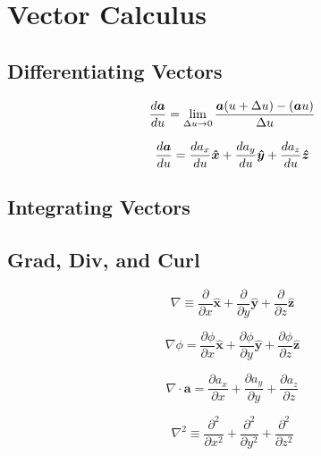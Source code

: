 \chapter{Vector Calculus}

\section{Differentiating Vectors}

\begin{equation*}
    \frac{d\boldsymbol{a}}{du} = \lim_{\Delta u \to 0}
    \frac{\boldsymbol{a}(u + \Delta u)-(\boldsymbol{a}u)}{\Delta u}
\end{equation*}

\begin{equation*}
    \frac{d\boldsymbol{a}}{du} = \frac{da_x}{du}\boldsymbol{\hat{x}} +
    \frac{da_y}{du}\boldsymbol{\hat{y}} +
    \frac{da_z}{du}\boldsymbol{\hat{z}}
\end{equation*}
\section{Integrating Vectors}

\section{Grad, Div, and Curl}

\begin{equation*}
    \nabla \equiv \frac{\partial}{\partial x}\boldsymbol{\hat{x}} +
    \frac{\partial}{\partial y}\boldsymbol{\hat{y}} +
    \frac{\partial}{\partial z}\boldsymbol{\hat{z}}
\end{equation*}

\begin{equation*}
    \nabla\phi = \frac{\partial\phi}{\partial x}\boldsymbol{\hat{x}} +
    \frac{\partial\phi}{\partial y}\boldsymbol{\hat{y}} +
    \frac{\partial\phi}{\partial z}\boldsymbol{\hat{z}}
\end{equation*}

\begin{equation*}
    \nabla \cdot \boldsymbol{a} = \frac{\partial a_{x}}{\partial x} + \frac{\partial a_{y}}{\partial y} + \frac{\partial a_{z}}{\partial z} 
\end{equation*}

\begin{equation*}
    \nabla^2 \equiv \frac{\partial^2}{\partial x^2} +
    \frac{\partial^2}{\partial y^2} +
    \frac{\partial^2}{\partial z^2}
\end{equation*}


